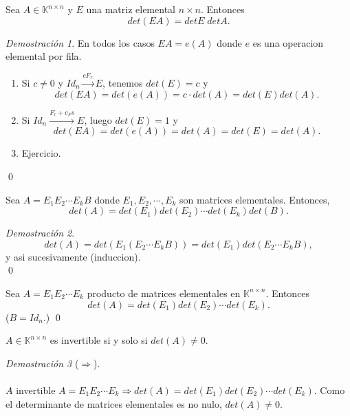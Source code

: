 \documentclass{article}
\theoremstyle{definition}
\theoremstyle{definition}
\theoremstyle{remark}
\newtheorem*{demo}{Demostración}
\begin{document}
\begin{teo}
  Sea $A \in \mathbb{K}^{n \times n}$ y $E$ una matriz elemental $n \times n$. Entonces \begin{equation}\tag{1}
    det(EA)=detE\;detA.
  \end{equation}
\end{teo}
\begin{demo}
   En todos los casos $EA=e(A)$ donde $e$ es una operacion elemental por fila.\begin{enumerate}[label=(E\arabic*)]
\item Si $c \neq 0$ y $Id_n \xrightarrow{cF_r} E$, tenemos $det(E)=c$ y \[
det(EA)=det(e(A))=c\cdot det(A)=det(E)det(A).
\]
\item Si $Id_n \xrightarrow{F_r+c_Fs} E$, luego $det(E)=1$ y \[
det(EA)=det(e(A))=det(A)=det(E)=det(A).
\]
\item Ejercicio.
   \end{enumerate}\qed
\end{demo}
\begin{corol}
  Sea $A=E_1E_2\cdots E_kB$ donde $E_1,E_2,\cdots,E_k$ son matrices elementales. Entonces, \[
det(A)=det(E_1)det(E_2)\cdots det(E_k)det(B).
  \]
\end{corol}
\begin{demo}
\[
det(A)=det(E_1(E_2\cdots E_k B)) = det(E_1) det(E_2 \cdots E_kB), 
\]
y asi sucesivamente (induccion). \\ \qed
\end{demo}
\begin{corol}
  Sea $A=E_1E_2\cdots E_k$ producto de matrices elementales en $\mathbb{K}^{n \times n}$. Entonces \[
det(A)=det(E_1)det(E_2)\cdots det(E_k).
  \]
  ($B =Id_n.$)
  \qed
\end{corol}
\begin{teo}
  $A \in \mathbb{K}^{n \times n}$ es invertible si y solo si $det(A)\neq 0$.
\end{teo}
\begin{demo}[$\Rightarrow$] \;\\\\
$A$ invertible $A=E_1E_2\cdots E_k \Rightarrow det(A)=det(E_1)det(E_2)\cdots det(E_k)$. Como el determinante de matrices elementales es no nulo, $det(A) \neq 0$. 
\end{demo}\;
\end{document}
